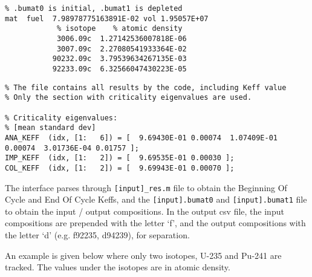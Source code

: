 \begin{lstlisting}[language={}]
% bumat file
% .bumat0 is initial, .bumat1 is depleted
mat  fuel  7.98978775163891E-02 vol 1.95057E+07
            % isotope    % atomic density
            3006.09c  1.27142536007818E-06
            3007.09c  2.27080541933364E-02
           90232.09c  3.79539634267135E-03
           92233.09c  6.32566047430223E-05
\end{lstlisting}

\begin{lstlisting}[language={}]
% _res.m file
% The file contains all results by the code, including Keff value
% Only the section with criticality eigenvalues are used.

% Criticality eigenvalues:
% [mean standard dev]
ANA_KEFF  (idx, [1:   6]) = [  9.69430E-01 0.00074  1.07409E-01 0.00074  3.01736E-04 0.01757 ];
IMP_KEFF  (idx, [1:   2]) = [  9.69535E-01 0.00030 ];
COL_KEFF  (idx, [1:   2]) = [  9.69943E-01 0.00070 ];
\end{lstlisting}


The interface parses through \texttt{[input]\_res.m} file
to obtain the Beginning Of Cycle and End Of Cycle Keffs, and the 
\texttt{[input].bumat0} and \texttt{[input].bumat1} file to obtain the
input / output compositions. In the output csv file, the input compositions
are prepended with the letter `f', and the output compositions with the letter `d'
(e.g. f92235, d94239), for separation. 

An example is given below where only two isotopes, U-235 and Pu-241 are tracked.
The values under the isotopes are in atomic density.

\begin{table}[h]
  \centering
    \caption{Example csv file generated by RAVEN running SERPENT}
    \label{tab:ser-rav}
\end {table}

